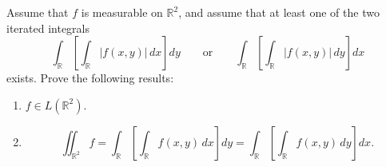 \begin{problem}
    Assume that \(f\) is measurable on \(\mathbb{R}^2\), and assume that at least
    one of the two iterated integrals
    \[
    \int_{\mathbb{R}}
    \left[
    \int_{\mathbb{R}} |f(x,y)|\,dx
    \right]dy
    \qquad\text{or}\qquad
    \int_{\mathbb{R}}
    \left[
    \int_{\mathbb{R}} |f(x,y)|\,dy
    \right]dx
    \]
    exists. Prove the following results:
    \begin{enumerate}
        \item[\textup{a)}] \(f\in L(\mathbb{R}^2)\).
    
        \item[\textup{b)}]
        \[
        \iint_{\mathbb{R}^2} f
        =
        \int_{\mathbb{R}}
        \left[
        \int_{\mathbb{R}} f(x,y)\,dx
        \right]dy
        =
        \int_{\mathbb{R}}
        \left[
        \int_{\mathbb{R}} f(x,y)\,dy
        \right]dx.
        \]
    \end{enumerate}
\end{problem}
